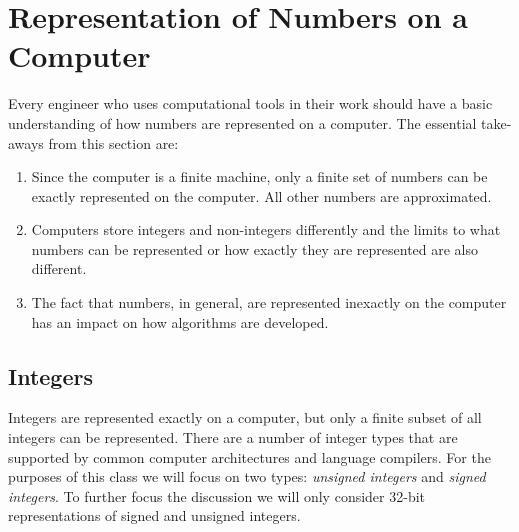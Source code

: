 \vspace{4.0cm}

\section{Representation of Numbers on a Computer}

Every engineer who uses computational tools in their work should have a basic understanding of how numbers are represented on a computer.  The essential take-aways from this section are:
\begin{enumerate}
\item Since the computer is a finite machine, only a finite set of numbers can be exactly represented on the computer.  All other numbers are approximated.
\item Computers store integers and non-integers differently and the limits to what numbers can be represented or how exactly they are represented are also different.
\item The fact that numbers, in general, are represented inexactly on the computer has an impact on how algorithms are developed.
\end{enumerate}

\subsection{Integers}
Integers are represented exactly on a computer, but only a finite subset of all integers can be represented.  There are a number of integer types that are supported by common computer architectures and language compilers. For the purposes of this class we will focus on two types: \emph{unsigned integers} and \emph{signed integers}.  To further focus the discussion we will only consider 32-bit representations of signed and unsigned integers.


